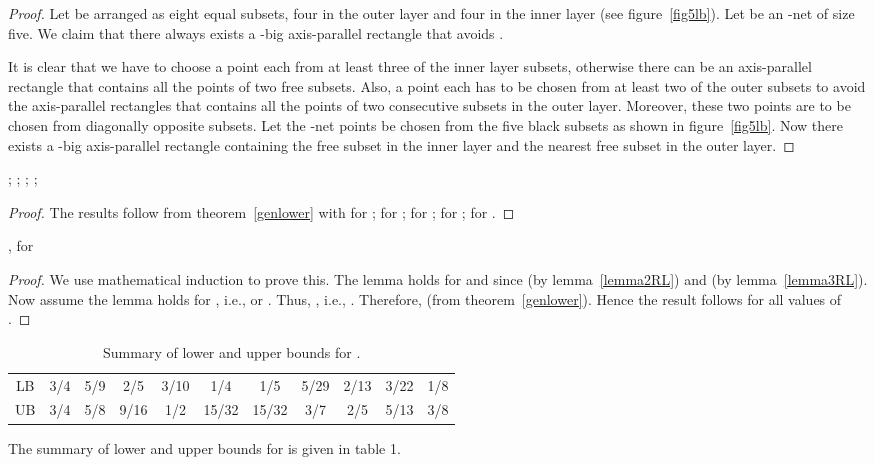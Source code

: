 \begin{lem}
  
\end{lem}
\begin{proof}
Let  be
arranged as eight equal subsets, four in the outer layer and four in the
inner layer (see figure~\ref{fig5lb}). Let  be an -net of size five. We claim that there always exists a -big axis-parallel rectangle that avoids .  

It is clear that we have to choose a point each from at least three of the inner
layer subsets, otherwise there can be an axis-parallel rectangle that contains
all the points of two free subsets. Also, a point each has to be chosen from
at least two of the outer subsets to avoid the axis-parallel rectangles
that contains all the points of two consecutive subsets in the outer layer. 
Moreover, these two points are to be chosen from diagonally opposite subsets. Let the -net points be chosen from the five black subsets as shown in figure~\ref{fig5lb}. Now there exists a -big axis-parallel rectangle containing the free subset in the
inner layer and the nearest free subset in the outer layer.


\end{proof}

\begin{lem}
; ; ;
; 
\end{lem}

\begin{proof}
 The results follow from theorem~\ref{genlower} with  for
;
 for ;  for
;  for ;
 for . 
\end{proof}

\begin{lem}
 , for 
\end{lem}
\begin{proof}
We use mathematical induction to prove this.
The lemma holds for  and  since  (by lemma~\ref{lemma2RL}) and
 (by lemma~\ref{lemma3RL}). Now assume the lemma holds for ,
i.e.,  or .
Thus, , 
i.e., .
Therefore,  (from theorem~\ref{genlower}).
Hence the result follows for all values of .


\end{proof}

\begin{table}[t]\label{rectable}
\begin{centering}

\begin{tabular}{|c|c|c|c|c|c|c|c|c|c|c|}
\hline
&&&&&&&&&&\\
\hline
LB&3/4&5/9&2/5&3/10&1/4&1/5&5/29&2/13&3/22&1/8\\
\hline
UB&3/4&5/8&9/16&1/2&15/32&15/32&3/7&2/5&5/13&3/8\\
\hline
\end{tabular}
\caption{Summary of lower and upper bounds for .
}
\end{centering}
\end{table} 

\noindent The summary of lower and upper bounds for  is given in table 1.
